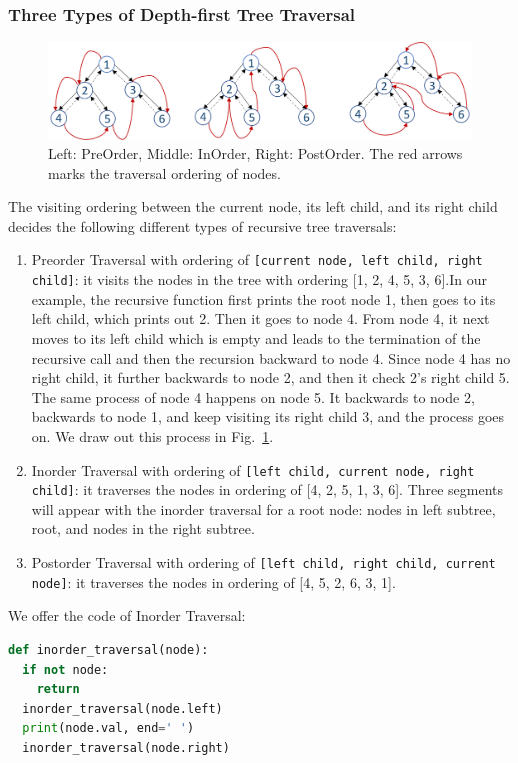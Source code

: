\documentclass[main.tex]{subfiles}
\begin{document}
\subsubsection{Three Types of Depth-first Tree Traversal}
\begin{figure}[!ht]
    \centering
    \includegraphics[width = .99\columnwidth]{fig/tree_traversal.png}
    \caption{Left: PreOrder, Middle: InOrder, Right: PostOrder. The red arrows marks the traversal ordering of nodes.}
    \label{fig:binary_tree_traversal}
\end{figure}
The visiting ordering between the current node, its left child, and its right child decides the following different types of recursive tree traversals: 

\begin{enumerate}[label=(\alph*)]
\item Preorder Traversal with ordering of  \texttt{[current node, left child, right child]}: it visits the nodes in the tree with ordering [1, 2, 4, 5, 3, 6].In our example, the recursive function first prints the root node 1, then goes to its left child, which prints out 2. Then it goes to node 4. From node 4, it next moves to its left child which is empty and leads to the termination of  the recursive call and then the recursion backward to node 4. Since node 4 has no right child, it further backwards to node 2, and then it check 2's right child 5. The same process of node 4 happens on node 5. It backwards to node 2, backwards to node 1, and keep visiting its right child 3, and the process goes on. We draw out this process in Fig.~\ref{fig:binary_tree_traversal}. 
\item Inorder Traversal with ordering of  \texttt{[left child, current node, right child]}: it traverses the nodes in ordering of [4, 2, 5, 1, 3, 6]. Three segments will appear with the inorder traversal for a root node: nodes in left subtree, root, and nodes in the right subtree.
\item Postorder Traversal with ordering of \texttt{[left child, right child, current node]}:  it traverses the nodes in ordering of [4, 5, 2, 6, 3, 1]. 
\end{enumerate}
We offer the code of Inorder Traversal:
\begin{lstlisting}[language=Python]
def inorder_traversal(node):
  if not node:
    return
  inorder_traversal(node.left)
  print(node.val, end=' ')
  inorder_traversal(node.right)
\end{lstlisting}
\end{document}
